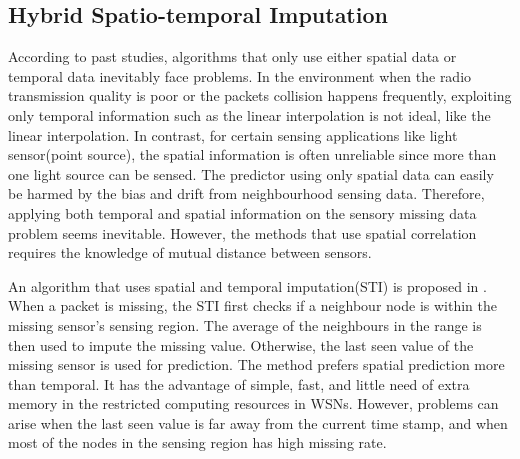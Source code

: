 \subsection{Hybrid Spatio-temporal Imputation}    
According to past studies, algorithms that only use either spatial data or temporal data inevitably face problems\cite{Lim:robust}. In the environment when the radio transmission quality is poor or the packets collision happens frequently, exploiting only temporal information such as the linear interpolation is not ideal, like the linear interpolation. In contrast, for certain sensing applications like light sensor(point source), the spatial information is often unreliable since more than one light source can be sensed. The predictor using only spatial data can easily be harmed by the bias and drift from neighbourhood sensing data. Therefore, applying both temporal and spatial information on the sensory missing data problem seems inevitable. However, the methods that use spatial correlation requires the knowledge of mutual distance between sensors.

An algorithm that uses spatial and temporal imputation(STI) is proposed in \cite{li2008spatial}. 
When a packet is missing, the STI first checks if a neighbour node is within the missing sensor's sensing region. 
The average of the neighbours in the range is then used to impute the missing value. 
Otherwise, the last seen value of the missing sensor is used for prediction. 
The method prefers spatial prediction more than temporal. 
It has the advantage of simple, fast, and little need of extra memory in the restricted computing resources in WSNs.
However, problems can arise when the last seen value is far away from the current time stamp, and when most of the nodes in the sensing region has high missing rate. 

